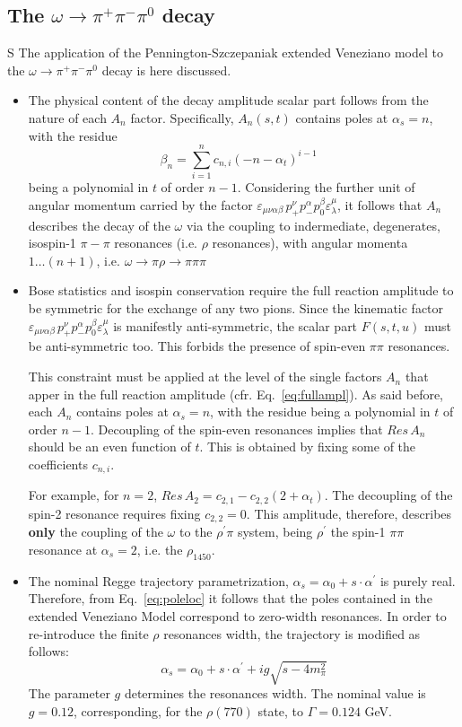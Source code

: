 \documentclass[a4paper,10pt]{report}
\newcommand{\decay}{$\omega \rightarrow \pi^+ \pi^- \pi^0$ }
\begin{document}
\subsection{The \decay decay}
S
The application of the Pennington-Szczepaniak extended Veneziano model to the \decay decay is here discussed.
\begin{itemize}
\item The physical content of the decay amplitude scalar part follows from the nature of each $A_n$ factor. Specifically, $A_n(s,t)$ 
contains poles at $\alpha_s=n$, with the residue
 $$\beta_n=\sum^n_{i=1} c_{n,i} (-n-\alpha_t)^{i-1} \; \; \;$$
being a polynomial in $t$ of order $n-1$.
Considering the further unit of angular momentum carried by the factor $\varepsilon_{\mu \nu \alpha \beta}\, p^{\nu}_{+}p^{\alpha}_{-}p^{\beta}_{0}\varepsilon^{\mu}_{\lambda}$,
it follows that $A_n$ describes the decay of the $\omega$ via the coupling to indermediate, degenerates, isospin-1 $\pi-\pi$ resonances (i.e. $\rho$ resonances),
with angular momenta $1\ldots (n+1)$, i.e. $\omega \rightarrow \pi \rho \rightarrow \pi\pi\pi$


 
\item Bose statistics and isospin conservation require the full reaction amplitude to be symmetric for the exchange of any two pions. Since the kinematic factor
 $\varepsilon_{\mu \nu \alpha \beta}\, p^{\nu}_{+}p^{\alpha}_{-}p^{\beta}_{0}\varepsilon^{\mu}_{\lambda}$ is manifestly anti-symmetric, the scalar part $F(s,t,u)$ must be anti-symmetric too.
This forbids the presence of spin-even $\pi \pi$ resonances.

This constraint must be applied at the level of the single factors $A_n$ that apper in the full reaction amplitude (cfr. Eq.~\ref{eq:fullampl}). 
As said before, each $A_n$ contains poles at $\alpha_s=n$, with the residue being a polynomial in $t$ of order $n-1$.
Decoupling of the spin-even resonances implies that $Res \, A_{n}$ should be an even function of $t$. This is obtained by fixing some of the coefficients $c_{n,i}$.

For example, for $n=2$, $Res \, A_{2}=c_{2,1}-c_{2,2}(2+\alpha_t)$. The decoupling of the spin-2 resonance requires fixing $c_{2,2}=0$. This amplitude, therefore,
describes \textbf{only} the coupling of the $\omega$ to the $\rho^\prime \pi$ system, being $\rho^\prime$ the spin-1 $\pi \pi$ resonance at $\alpha_s=2$, i.e. the $\rho_{1450}$.

\item The nominal Regge trajectory parametrization, $\alpha_s=\alpha_0+s\cdot\alpha^{\prime}$ is purely real. Therefore, from Eq.~\ref{eq:poleloc} it follows that the poles contained in the extended Veneziano Model correspond to zero-width resonances. In order to re-introduce the finite $\rho$ resonances width, the trajectory is modified as follows:
\begin{equation}
\alpha_s=\alpha_0 + s \cdot \alpha^\prime + i g \sqrt{s-4m^2_\pi}
\end{equation}
The parameter $g$ determines the resonances width. The nominal value is $g=0.12$, corresponding, for the $\rho(770)$ state, to $\Gamma=0.124$ GeV.
\end{itemize}
\end{document}
